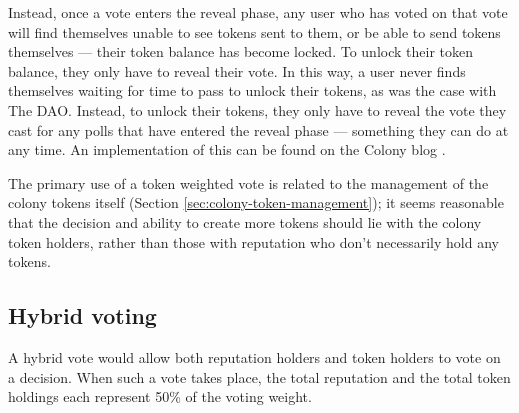Instead, once a vote enters the reveal phase, any user who has voted on that vote will find themselves unable to see tokens sent to them, or be able to send tokens themselves --- their token balance has become locked. To unlock their token balance, they only have to reveal their vote. In this way, a user never finds themselves waiting for time to pass to unlock their tokens, as was the case with The DAO. Instead, to unlock their tokens, they only have to reveal the vote they cast for any polls that have entered the reveal phase --- something they can do at any time. An implementation of this can be found on the Colony blog \cite{ColonyVoting}.

The primary use of a token weighted vote is related to the management of the colony tokens itself (Section \ref{sec:colony-token-management}); it seems reasonable that the decision and ability to create more tokens should lie with the colony token holders, rather than those with reputation who don't necessarily hold any tokens.

\subsection{Hybrid voting}
A hybrid vote would allow both reputation holders and token holders to vote on a decision. When such a vote takes place, the total reputation and the total token holdings each represent 50\% of the voting weight.